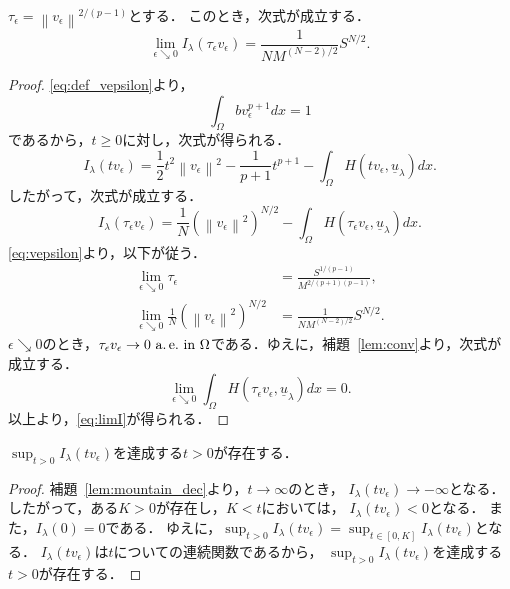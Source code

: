 \begin{lem} \label{lem:tauepsilon}
 $\tau_\epsilon = \left\| v_\epsilon \right\|^{2/(p-1)}$とする．
 このとき，次式が成立する．
 \begin{equation}
  \lim_{\epsilon \searrow 0} I_\lambda (\tau_\epsilon v_\epsilon) = 
   \frac{1}{NM^{(N-2)/2}} S^{N/2}. \label{eq:limI}
 \end{equation}
\end{lem}

\begin{proof}
 \eqref{eq:def_vepsilon}より，
 \[
  \int_\Omega bv_\epsilon^{p+1} dx = 1
 \]
 であるから，$t \geq 0$に対し，次式が得られる．
 \[
  I_\lambda(tv_\epsilon) = \frac{1}{2} t^2 \left\| v_\epsilon
 \right\|^2 - \frac{1}{p+1} t^{p+1} - \int_\Omega H(tv_\epsilon,
 \underline{u}_\lambda) dx.
 \]
 したがって，次式が成立する．
 \[
  I_\lambda(\tau_\epsilon v_\epsilon) = \frac{1}{N} \left( \left\|
 v_\epsilon \right\|^2 \right)^{N/2} - \int_\Omega H(\tau_\epsilon
 v_\epsilon, \underline{u}_\lambda) dx.
 \]
 \eqref{eq:vepsilon}より，以下が従う．
 \begin{align*}
  \lim_{\epsilon \searrow 0} \tau_\epsilon
  &= \frac{S^{1/(p-1)}}{M^{2/(p+1)(p-1)}}, \\
  \lim_{\epsilon \searrow 0} \frac{1}{N} \left( \left\|
 v_\epsilon \right\|^2 \right)^{N/2} &= \frac{1}{NM^{(N-2)/2}}
  S^{N/2}.
 \end{align*}
 $\epsilon \searrow 0$のとき，$\tau_\epsilon v_\epsilon \to 0 ~\text{a.\,e.}~
 \text{in}~ \Omega$である．ゆえに，補題~\ref{lem:conv}より，次式が成立する．
 \[
  \lim_{\epsilon \searrow 0} \int_\Omega H(\tau_\epsilon
 v_\epsilon, \underline{u}_\lambda) dx = 0.
 \]
 以上より，\eqref{eq:limI}が得られる．\qedhere
\end{proof}

\begin{lem} \label{lem:t_epsilon}
$\sup_{t > 0} I_\lambda (tv_\epsilon)$を達成する$t > 0$が存在する．
\end{lem}

\begin{proof}
補題~\ref{lem:mountain_dec}より，$t \to \infty$のとき，
$I_\lambda(t v_\epsilon) \to -\infty$となる．
したがって，ある$K>0$が存在し，$K < t$においては，
$I_\lambda(t v_\epsilon) < 0$となる．
また，$I_\lambda(0) = 0$である．
ゆえに，$\sup_{t > 0} I_\lambda (tv_\epsilon) = 
\sup_{t \in [0, K]} I_\lambda (tv_\epsilon)$となる．
$I_\lambda(tv_\epsilon)$は$t$についての連続関数であるから，
$\sup_{t > 0} I_\lambda (tv_\epsilon)$を達成する$t > 0$が存在する．\qedhere
\end{proof}

